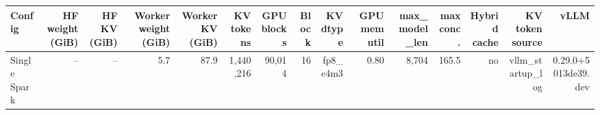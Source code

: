 \begin{tabular}{l r r r r r r r r r r r r r r }
\toprule
Config & HF weight (GiB) & HF KV (GiB) & Worker weight (GiB) & Worker KV (GiB) & KV tokens & GPU blocks & Block & KV dtype & GPU mem util & max\_model\_len & max conc. & Hybrid cache & KV token source & vLLM \\
\midrule
Single Spark & -- & -- & 5.7 & 87.9 & 1,440,216 & 90,014 & 16 & fp8\_e4m3 & 0.80 & 8,704 & 165.5 & no & vllm\_startup\_log & 0.29.0+5013de39.dev \\
\bottomrule
\end{tabular}
